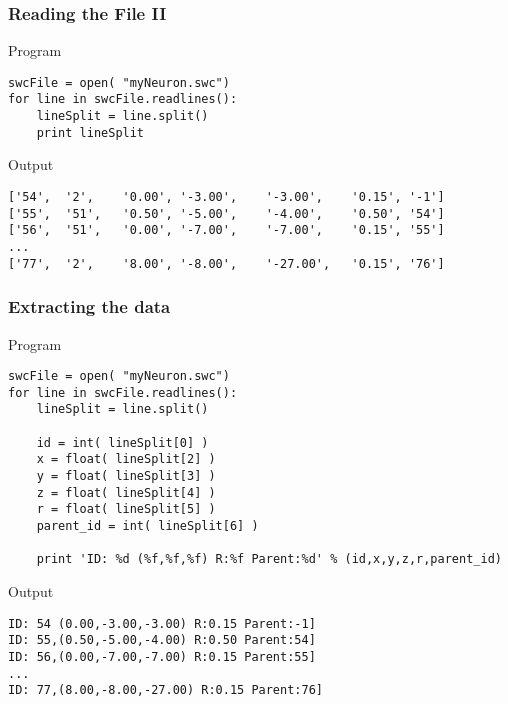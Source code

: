 \documentclass{beamer}
\begin{document}
\begin{frame}[fragile]
	\frametitle{Reading the File II}
	\scriptsize

\begin{block}{Program}
\begin{verbatim}
swcFile = open( "myNeuron.swc")
for line in swcFile.readlines():
    lineSplit = line.split()
    print lineSplit
\end{verbatim}
\end{block}

\begin{block}{Output}
\begin{verbatim}
['54',	'2',	'0.00',	'-3.00',	'-3.00',	'0.15',	'-1']
['55',	'51',	'0.50',	'-5.00',	'-4.00',	'0.50',	'54']
['56',	'51',	'0.00',	'-7.00',	'-7.00',	'0.15',	'55']
...
['77',	'2',	'8.00',	'-8.00',	'-27.00',	'0.15',	'76']
\end{verbatim}
\end{block}
\end{frame}




\begin{frame}[fragile]
	\frametitle{Extracting the data}
	\scriptsize

\begin{block}{Program}
\begin{verbatim}
swcFile = open( "myNeuron.swc")
for line in swcFile.readlines():
    lineSplit = line.split()
	
    id = int( lineSplit[0] )
    x = float( lineSplit[2] ) 
    y = float( lineSplit[3] ) 
    z = float( lineSplit[4] ) 
    r = float( lineSplit[5] ) 
    parent_id = int( lineSplit[6] ) 

    print 'ID: %d (%f,%f,%f) R:%f Parent:%d' % (id,x,y,z,r,parent_id)
\end{verbatim}
\end{block}

\begin{block}{Output}

\begin{verbatim}
ID: 54 (0.00,-3.00,-3.00) R:0.15 Parent:-1]
ID: 55,(0.50,-5.00,-4.00) R:0.50 Parent:54]
ID: 56,(0.00,-7.00,-7.00) R:0.15 Parent:55]
...
ID: 77,(8.00,-8.00,-27.00) R:0.15 Parent:76]
\end{verbatim}
\end{block}
\end{frame}
\end{document}
